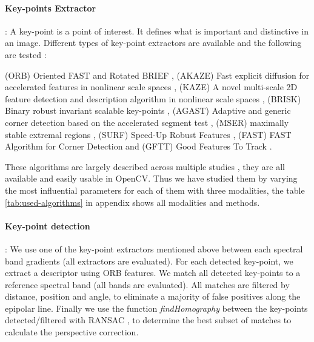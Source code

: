 \documentclass[a4paper,twoside]{article}
\begin{document}
	\paragraph{Key-points Extractor} :
	A key-point is a point of interest. It defines what is important and distinctive in an image.
	Different types of key-point extractors are available and the following are tested :
	\\
	\par (ORB) Oriented FAST and Rotated BRIEF \cite{Rublee:2011:OEA:2355573.2356268}, 
	(AKAZE) Fast explicit diffusion for accelerated features in nonlinear scale spaces \cite{alcantarilla2011fast}, 
	(KAZE) A novel multi-scale 2D feature detection and description algorithm in nonlinear scale spaces \cite{rs10050756}, 
	(BRISK) Binary robust invariant scalable key-points \cite{leutenegger2011brisk}, 
	(AGAST) Adaptive and generic corner detection based on the accelerated segment test \cite{mair2010adaptive}, 
	(MSER) maximally stable extremal regions \cite{donoser2006efficient}, 
	(SURF) Speed-Up Robust Features \cite{bay2006surf}, 
	(FAST) FAST Algorithm for Corner Detection \cite{trajkovic1998fast}
	and (GFTT) Good Features To Track \cite{shi1994good}.
	\\
	\par These algorithms are largely described across multiple studies \cite{DantasDiasJunior, Tareen2018ACA, Zhang2016EXTENSIONAE, ali2016comparison},
	they are all available and easily usable in OpenCV. Thus we have studied them by varying the most influential parameters for each of them with three modalities,
	the table \ref{tab:used-algorithms} in appendix shows all modalities and methods.
	
	\paragraph{Key-point detection} : \label{sec:perspective}
	We use one of the key-point extractors mentioned above between each spectral band gradients (all extractors are evaluated).
	For each detected key-point, we extract a descriptor using ORB features.
	We match all detected key-points to a reference spectral band (all bands are evaluated).
	All matches are filtered by distance, position and angle, to eliminate a majority of false positives along the epipolar line.
	Finally we use the function \textit{findHomography} between the key-points detected/filtered with RANSAC \cite{Fischler:1981:RSC:358669.358692},
	to determine the best subset of matches to calculate the perspective correction.
	
\end{document}
